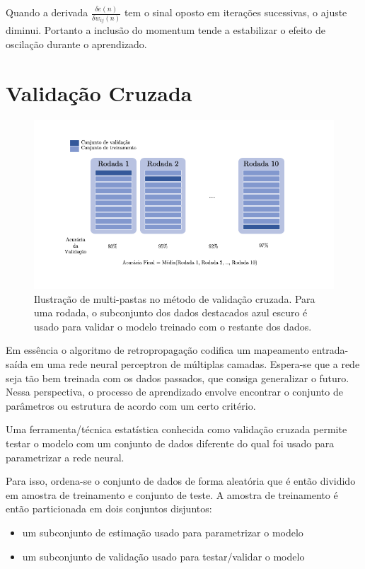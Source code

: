 Quando a derivada $\frac{\delta e(n)}{\delta w_{ij}(n)}$ tem o sinal oposto em iterações sucessivas, o ajuste diminui. Portanto a inclusão do momentum tende a estabilizar o efeito de oscilação durante o aprendizado.

\section{Validação Cruzada}

\begin{figure}[H]
  \centering
  \includegraphics[width=450pt]{figuras/validacao_cruzada.png}
  \caption{Ilustração de multi-pastas no método de validação cruzada. Para uma rodada, o subconjunto dos dados destacados azul escuro é usado para validar o modelo treinado com o restante dos dados.}
  \label{fig:validacao_cruzada}
\end{figure}

Em essência o algoritmo de retropropagação codifica um mapeamento entrada-saída em uma rede neural perceptron de múltiplas camadas. Espera-se que a rede seja tão bem treinada com os dados passados, que consiga generalizar o futuro. Nessa perspectiva, o processo de aprendizado envolve encontrar o conjunto de parâmetros ou estrutura de acordo com um certo critério.

Uma ferramenta/técnica estatística conhecida como validação cruzada \cite{stone1974cross} permite testar o modelo com um conjunto de dados diferente do qual foi usado para parametrizar a rede neural.

Para isso, ordena-se o conjunto de dados de forma aleatória que é então dividido em amostra de treinamento e conjunto de teste. A amostra de treinamento é então particionada em dois conjuntos disjuntos:

\begin{itemize}
    \item um subconjunto de estimação usado para parametrizar o modelo
    \item um subconjunto de validação usado para testar/validar o modelo
\end{itemize}

